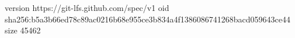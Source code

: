 version https://git-lfs.github.com/spec/v1
oid sha256:b5a3b66ed78c89ac0216b68e955ce3b834a4f1386086741268bacd059643ce44
size 45462
